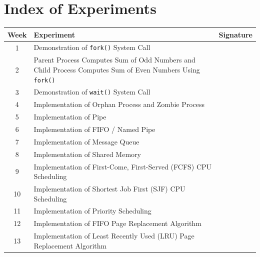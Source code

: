\documentclass[12pt,a4paper]{report}
\begin{document}
\tableofcontents

\clearpage


\chapter*{Index of Experiments}

\begin{longtable}{|c|p{10cm}|c|}
\hline
\textbf{Week} & \textbf{Experiment} & \textbf{Signature} \\
\hline

1 &
Demonstration of \texttt{fork()} System Call
& \\[0.6cm]
\hline

2 &
Parent Process Computes Sum of Odd Numbers and Child Process Computes
Sum of Even Numbers Using \texttt{fork()}
& \\[0.6cm]
\hline

3 &
Demonstration of \texttt{wait()} System Call
& \\[0.6cm]
\hline

4 &
Implementation of Orphan Process and Zombie Process
& \\[0.6cm]
\hline

5 &
Implementation of Pipe
& \\[0.6cm]
\hline

6 &
Implementation of FIFO / Named Pipe
& \\[0.6cm]
\hline

7 &
Implementation of Message Queue
& \\[0.6cm]
\hline

8 &
Implementation of Shared Memory
& \\[0.6cm]
\hline

9 &
Implementation of First-Come, First-Served (FCFS) CPU Scheduling
& \\[0.6cm]
\hline

10 &
Implementation of Shortest Job First (SJF) CPU Scheduling
& \\[0.6cm]
\hline

11 &
Implementation of Priority Scheduling
& \\[0.6cm]
\hline

12 &
Implementation of FIFO Page Replacement Algorithm
& \\[0.6cm]
\hline

13 &
Implementation of Least Recently Used (LRU) Page Replacement Algorithm
& \\[0.6cm]
\hline

\end{longtable}
\end{document}
